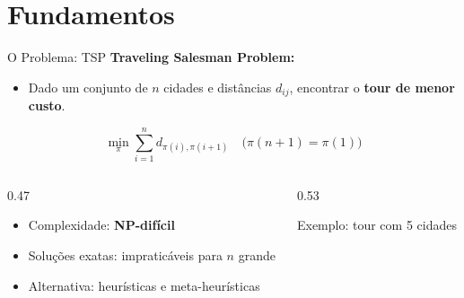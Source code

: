 \documentclass[11pt, xcolor=dvipsnames]{beamer}
\newcommand{\destaque}[1]{\textbf{\textcolor{verde}{#1}}}
\newcommand{\sutil}[1]{\textcolor{textoBase!60}{#1}}
\begin{document}
\section{Fundamentos}

\begin{frame}{O Problema: TSP}
  \footnotesize
  \textbf{Traveling Salesman Problem:}
  \vspace{2mm}
  \begin{itemize}
    \item Dado um conjunto de $n$ cidades e distâncias $d_{ij}$, encontrar o \destaque{tour de menor custo}.
  \end{itemize}
  \vspace{2mm}
  \[
    \min_{\pi} \sum_{i=1}^{n} d_{\pi(i), \pi(i+1)} \quad \big( \pi(n+1) = \pi(1) \big)
  \]
  \vspace{2mm}
  \begin{columns}[T]
    \begin{column}{0.47\textwidth}
      \begin{itemize}
        \item Complexidade: \destaque{NP-difícil}
        \item Soluções exatas: impraticáveis para $n$ grande
        \item Alternativa: heurísticas e meta-heurísticas
      \end{itemize}
    \end{column}
    \begin{column}{0.53\textwidth}
      \centering
      \vspace{1mm}
      {\scriptsize \sutil{Exemplo: tour com 5 cidades}}
    \end{column}
  \end{columns}
\end{frame}
\end{document}
